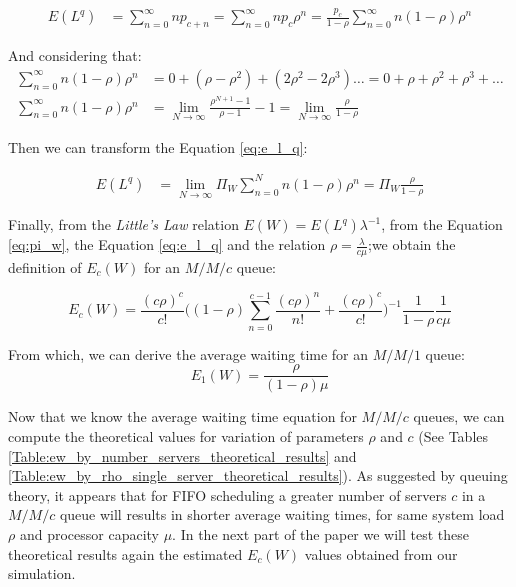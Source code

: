 \documentclass{article}
\begin{document}
    \begin{align}
        E(L^q) &= \sum_{n=0}^{\infty} n p_{c + n} = \sum_{n=0}^{\infty} n p_c \rho^n = \frac{p_c}{1 - \rho} \sum_{n=0}^{\infty} n (1 - \rho) \rho^n
        \label{eq:e_l_q}
    \end{align}

    And considering that:
    \begin{align}
        \sum_{n=0}^{\infty} n (1 - \rho) \rho^n &= 0 + (\rho - \rho^2) + (2\rho^2 -2\rho^3) \ldots = 0 + \rho + \rho^2 + \rho^3 + \ldots \\
        \sum_{n=0}^{\infty} n (1 - \rho) \rho^n &= \lim_{N\to\infty} \frac{\rho^{N + 1} - 1}{\rho - 1} - 1 = \lim_{N\to\infty} \frac{\rho}{1 - \rho}
    \end{align}

    Then we can transform the Equation \ref{eq:e_l_q}:

    \begin{align}
        E(L^q) &= \lim_{N\to\infty} \Pi_W \sum_{n=0}^{N} n (1 - \rho) \rho^n = \Pi_W \frac{\rho}{1 - \rho}
        \label{eq:e_l_q}
    \end{align}

    Finally, from the \emph{Little's Law} relation $E(W) = E(L^q) \lambda^{-1}$, from the Equation \ref{eq:pi_w}, the Equation \ref{eq:e_l_q} and the relation $\rho = \frac{\lambda}{c\mu}$;we obtain the definition of $E_c(W)$ for an $M/M/c$ queue:

    \begin{equation}
        E_c(W) = \frac{(c \rho)^c}{c !} \Big((1 - \rho) \sum_{n = 0}^{c-1}\frac{(c \rho)^n}{n !} + \frac{(c \rho)^c}{c !} \Big)^{-1} \frac{1}{1 - \rho} \frac{1}{c \mu}
    \end{equation}

    From which, we can derive the average waiting time for an $M/M/1$ queue:
    \begin{equation}
        E_1(W) =  \frac{\rho}{(1 - \rho)\mu}
    \end{equation}

    Now that we know the average waiting time equation for $M/M/c$ queues, we can compute the theoretical values for variation of parameters $\rho$ and $c$ (See Tables \ref{Table:ew_by_number_servers_theoretical_results} and \ref{Table:ew_by_rho_single_server_theoretical_results}).
    As suggested by queuing theory, it appears that for FIFO scheduling a greater number of servers $c$ in a $M/M/c$ queue will results in shorter average waiting times, for same system load $\rho$ and processor capacity $\mu$.
    In the next part of the paper we will test these theoretical results again the estimated $E_c(W)$ values obtained from our simulation.
\end{document}
